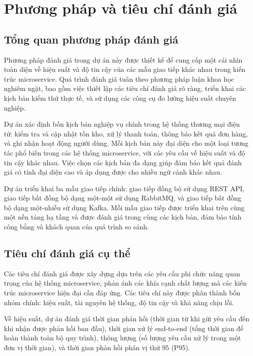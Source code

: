 \section{Phương pháp và tiêu chí đánh giá}

\subsection{Tổng quan phương pháp đánh giá}
Phương pháp đánh giá trong dự án này được thiết kế để cung cấp một cái nhìn toàn diện về hiệu suất và độ tin cậy của các mẫu giao tiếp khác nhau trong kiến trúc microservice. Quá trình đánh giá tuân theo phương pháp luận khoa học nghiêm ngặt, bao gồm việc thiết lập các tiêu chí đánh giá rõ ràng, triển khai các kịch bản kiểm thử thực tế, và sử dụng các công cụ đo lường hiệu suất chuyên nghiệp.

Dự án xác định bốn kịch bản nghiệp vụ chính trong hệ thống thương mại điện tử: kiểm tra và cập nhật tồn kho, xử lý thanh toán, thông báo kết quả đơn hàng, và ghi nhận hoạt động người dùng. Mỗi kịch bản này đại diện cho một loại tương tác phổ biến trong các hệ thống microservice, với các yêu cầu về hiệu suất và độ tin cậy khác nhau. Việc chọn các kịch bản đa dạng giúp đảm bảo kết quả đánh giá có tính đại diện cao và áp dụng được cho nhiều ngữ cảnh khác nhau.

Dự án triển khai ba mẫu giao tiếp chính: giao tiếp đồng bộ sử dụng REST API, giao tiếp bất đồng bộ dạng một-một sử dụng RabbitMQ, và giao tiếp bất đồng bộ dạng một-nhiều sử dụng Kafka. Mỗi mẫu giao tiếp được triển khai trên cùng một nền tảng hạ tầng và được đánh giá trong cùng các kịch bản, đảm bảo tính công bằng và khách quan của quá trình so sánh.

\subsection{Tiêu chí đánh giá cụ thể}
Các tiêu chí đánh giá được xây dựng dựa trên các yêu cầu phi chức năng quan trọng của hệ thống microservice, phản ánh các khía cạnh chất lượng mà các kiến trúc microservice hiện đại cần đáp ứng. Các tiêu chí này được phân thành bốn nhóm chính: hiệu suất, tài nguyên hệ thống, độ tin cậy và khả năng chịu lỗi.

Về hiệu suất, dự án đánh giá thời gian phản hồi (thời gian từ khi gửi yêu cầu đến khi nhận được phản hồi ban đầu), thời gian xử lý end-to-end (tổng thời gian để hoàn thành toàn bộ quy trình), thông lượng (số lượng yêu cầu xử lý trong một đơn vị thời gian), và thời gian phản hồi phân vị thứ 95 (P95).

